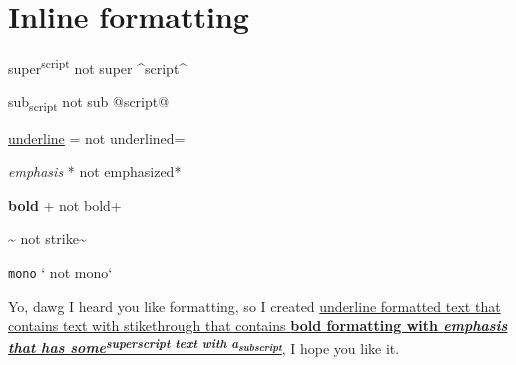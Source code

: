 \section{\label{inline-formatting}Inline formatting}
\par super\textsuperscript{script} not super {\textasciicircum}script{\textasciicircum}
\par sub\textsubscript{script} not sub @script@
\par \ul{underline} = not underlined=
\par \emph{emphasis} * not emphasized*
\par \textbf{bold} + not bold+
\par {} {\textasciitilde} not strike{\textasciitilde}
\par \texttt{mono} ` not mono`
\par Yo, dawg I heard you like formatting, so I created \ul{underline formatted text that contains text with stikethrough that contains \textbf{bold formatting with \emph{emphasis that has some\textsuperscript{superscript text with a\textsubscript{subscript}}}}}, I hope you like it. 